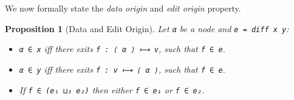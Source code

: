 \documentclass{sigplanconf}
\theoremstyle{plain}
\newtheorem{prop}{Proposition}
\begin{document}


We now formally state the \emph{data origin} and \emph{edit origin} property.
\begin{prop}[Data and Edit Origin]
\label{prop:sanity}
Let \texttt{α} be a node and \texttt{e = diff x y}:
\begin{itemize}
\item \texttt{α ∈ x} iff there exits \texttt{f : ⟨ α ⟩ ⟼ v}, such that
  \texttt{f ∈ e}.
\item \texttt{α ∈ y} iff there exits \texttt{f : v ⟼ ⟨ α ⟩}, such that
  \texttt{f ∈ e}.
\item If \texttt{f ∈ (e₁ ⊔₃ e₂)} then either \texttt{f ∈ e₁} or
  \texttt{f ∈ e₂}.
\end{itemize}
\end{prop}
\end{document}
